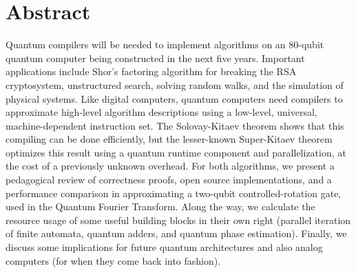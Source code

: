 \section{Abstract}

Quantum compilers will be needed to implement algorithms on an
80-qubit quantum computer being constructed in the next five years.
Important applications include Shor's factoring algorithm for breaking
the RSA cryptosystem, unstructured search, solving random walks, and
the simulation of physical systems. Like digital computers, quantum
computers need compilers to approximate high-level algorithm
descriptions using a low-level, universal, machine-dependent
instruction set. The Solovay-Kitaev theorem shows that this compiling
can be done efficiently, but the lesser-known Super-Kitaev theorem
optimizes this result using a quantum runtime component and
parallelization, at the cost of a previously unknown overhead. For
both algorithms, we present a pedagogical review of correctness
proofs, open source implementations, and a performance comparison in
approximating a two-qubit controlled-rotation gate, used in the
Quantum Fourier Transform. Along the way, we calculate the resource
usage of some useful building blocks in their own right (parallel
iteration of finite automata, quantum adders, and quantum phase
estimation). Finally, we discuss some implications for future quantum
architectures and also analog computers (for when they come back into
fashion).